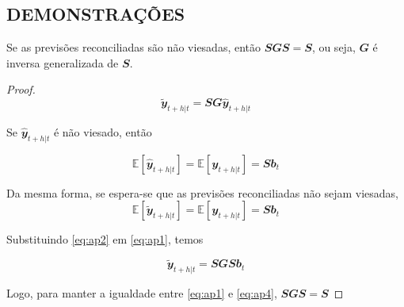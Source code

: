 \postextual

\begin{apendicesenv}
\partapendices

\chapter{DEMONSTRAÇÕES} \label{apendice_demonstracoes}

\begin{proposition}
  \label{proposicao1}

  Se as previsões reconciliadas são não viesadas, então $\mathbfit{SGS=S}$, ou seja, $\mathbfit{G}$ é inversa generalizada de $\mathbfit{S}$.

\end{proposition}

\begin{proof}
  \begin{equation} \label{eq:ap1}
    \mathbfit{\tilde{y}}_{t+h|t} = \mathbfit{SG\hat{y}}_{t+h|t} 
  \end{equation}

  Se $\mathbfit{\hat{y}}_{t+h|t}$ é não viesado, então 

  \begin{equation} \label{eq:ap2}
      \mathbb{E}[\mathbfit{\hat{y}}_{t+h|t}] = \mathbb{E}[\mathbfit{y}_{t+h|t}] = \mathbfit{Sb}_t
  \end{equation}

  Da mesma forma, se espera-se que as previsões reconciliadas não sejam viesadas,
  \begin{equation} \label{eq:ap3}
      \mathbb{E}[\mathbfit{\tilde{y}}_{t+h|t}] = \mathbb{E}[\mathbfit{y}_{t+h|t}] = \mathbfit{Sb}_t
  \end{equation}

  Substituindo \eqref{eq:ap2} em \eqref{eq:ap1}, temos

  \begin{equation} \label{eq:ap4}
      \mathbfit{\tilde{y}}_{t+h|t} = \mathbfit{SGSb}_t 
  \end{equation}

  Logo, para manter a igualdade entre \eqref{eq:ap1} e \eqref{eq:ap4}, $\mathbfit{SGS=S}$

\end{proof}

\begin{proposition}
  \label{proposicao2}


\end{proposition}
\end{apendicesenv}
